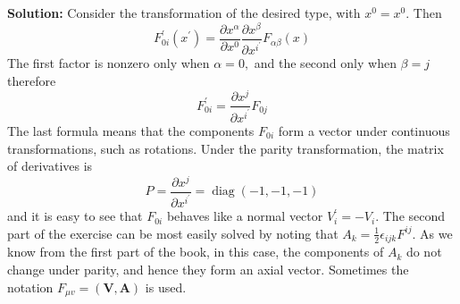 \textbf{Solution:}
Consider the transformation of the desired type, with $x^{0}=x^{0} .$ Then
$$
F_{0 i}^{\prime}\left(x^{\prime}\right)=\frac{\partial x^{\alpha}}{\partial x^{0}} \frac{\partial x^{\beta}}{\partial x^{i^{\prime}}} F_{\alpha \beta}(x)
$$
The first factor is nonzero only when $\alpha=0,$ and the second only when $\beta=j$ therefore
$$
F_{0 i}^{\prime}=\frac{\partial x^{j}}{\partial x^{i^{\prime}}} F_{0 j}
$$
The last formula means that the components $F_{0 i}$ form a vector under continuous transformations, such as rotations. Under the parity transformation, the matrix of derivatives is
$$
P=\frac{\partial x^{j}}{\partial x^{i^{\prime}}}=\operatorname{diag}(-1,-1,-1)
$$
and it is easy to see that $F_{0 i}$ behaves like a normal vector $V_{i}^{\prime}=-V_{i} .$ The second part of the exercise can be most easily solved by noting that $A_{k}=\frac{1}{2} \epsilon_{i j k} F^{i j} .$ As we know from the first part of the book, in this case, the components of $A_{k}$ do not change under parity, and hence they form an axial vector. Sometimes the notation $F_{\mu v}=(\mathbf{V}, \mathbf{A})$ is used.

